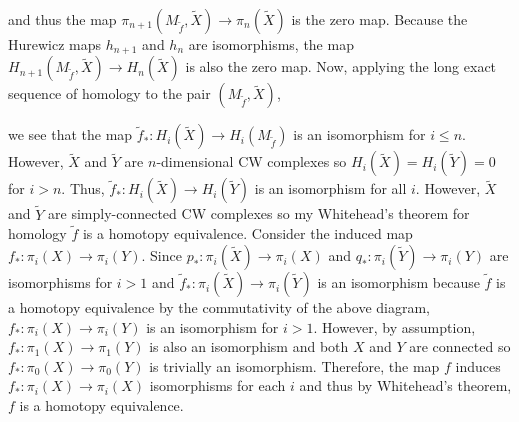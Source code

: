 \documentclass[12pt]{extarticle}
\begin{document}
and thus the map $\pi_{n+1}(M_{\tilde{f}}, \tilde{X}) \to \pi_n(\tilde{X})$ is the zero map. Because the Hurewicz maps $h_{n+1}$ and $h_n$ are isomorphisms, the map $H_{n+1}(M_{\tilde{f}}, \tilde{X}) \to H_n(\tilde{X})$ is also the zero map.
Now, applying the long exact sequence of homology to the pair $(M_{\tilde{f}}, \tilde{X})$,
\begin{center}
\end{center}
we see that the map $\tilde{f}_* : H_i(\tilde{X}) \to H_i(M_{\tilde{f}})$ is an isomorphism for $i \le n$. However, $\tilde{X}$ and $\tilde{Y}$ are $n$-dimensional CW complexes so $H_i(\tilde{X}) = H_i(\tilde{Y}) = 0$ for $i > n$. Thus, $\tilde{f}_* : H_i(\tilde{X}) \to H_i(\tilde{Y})$ is an isomorphism for all $i$. However, $\tilde{X}$ and $\tilde{Y}$ are simply-connected CW complexes so my Whitehead's theorem for homology $\tilde{f}$ is a homotopy equivalence. Consider the induced map $f_* : \pi_i(X) \to \pi_i(Y)$. Since $p_* : \pi_i(\tilde{X}) \to \pi_i(X)$ and $q_* : \pi_i(\tilde{Y}) \to \pi_i(Y)$ are isomorphisms for $i > 1$ and $\tilde{f}_* : \pi_i(\tilde{X}) \to \pi_i(\tilde{Y})$ is an isomorphism because $\tilde{f}$ is a homotopy equivalence by the commutativity of the above diagram, $f_* : \pi_i(X) \to \pi_i(Y)$ is an isomorphism for $i > 1$. However, by assumption, $f_* : \pi_1(X) \to \pi_1(Y)$ is also an isomorphism and both $X$ and $Y$ are connected so $f_* : \pi_0(X) \to \pi_0(Y)$ is trivially an isomorphism. Therefore, the map $f$ induces $f_* : \pi_i(X) \to \pi_i(X)$ isomorphisms for each $i$ and thus by Whitehead's theorem, $f$ is a homotopy equivalence.
\end{document}
